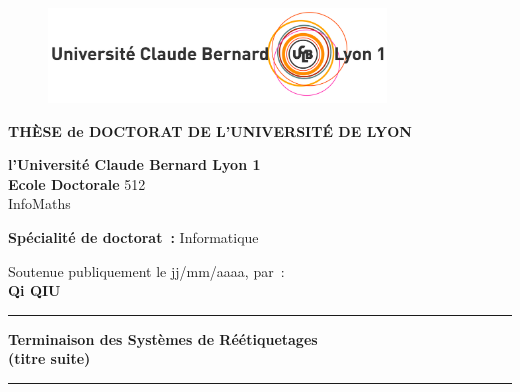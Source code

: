 
\begin{titlepage}

    \unitlength 1cm
    \begin{center}
    
    \vspace*{-2.5cm}
    \begin{figure}[h]
        \centering
        \includegraphics[width=0.8\textwidth]{LogoLyon1Off_CoulCmjn300dpi.jpg}
    \end{figure}
    
               {\large\bf THÈSE de DOCTORAT DE L'UNIVERSITÉ DE LYON\\}
   
               {\large \bf l'Université Claude Bernard Lyon 1\\}
    \vspace{12pt}
               {\large \textbf{Ecole Doctorale} 512 \\InfoMaths}

    \vspace{12pt}
    
               {\large \textbf{Spécialité de doctorat~:} Informatique \\}
    
    \vspace{0.8cm}
    
               {Soutenue publiquement le jj/mm/aaaa, par~:\\}
               {\Large\bf {Qi QIU}}
    \vspace{0.5cm}           
    
    
    \rule{5cm}{1pt}
    
    \vspace{12pt}
               
               {\LARGE \bf Terminaison des Systèmes de Réétiquetages}\\
               \vspace{0.3cm}
               {\Large \bf (titre suite)}
               
    \vspace{12pt}
    \rule{5cm}{1pt}
    

\end{center}
\end{titlepage}
